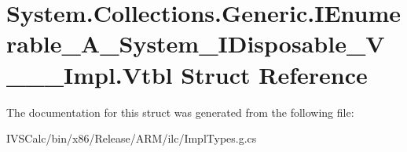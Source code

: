 \hypertarget{struct_system_1_1_collections_1_1_generic_1_1_i_enumerable___a___system___i_disposable___v_______impl_1_1_vtbl}{}\section{System.\+Collections.\+Generic.\+I\+Enumerable\+\_\+\+A\+\_\+\+System\+\_\+\+I\+Disposable\+\_\+\+V\+\_\+\+\_\+\+\_\+\+Impl.\+Vtbl Struct Reference}
\label{struct_system_1_1_collections_1_1_generic_1_1_i_enumerable___a___system___i_disposable___v_______impl_1_1_vtbl}


The documentation for this struct was generated from the following file\+:\begin{DoxyCompactItemize}
\item 
I\+V\+S\+Calc/bin/x86/\+Release/\+A\+R\+M/ilc/Impl\+Types.\+g.\+cs\end{DoxyCompactItemize}
